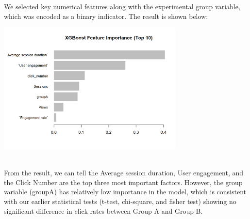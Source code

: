 \documentclass[
  letterpaper,
  DIV=11,
  numbers=noendperiod]{scrartcl}
\begin{document}
We selected key numerical features along with the experimental group
variable, which was encoded as a binary indicator. The result is shown
below:\\
\begin{center}
\includegraphics[width=0.7\textwidth,height=\textheight]{data_ana_pj3_files/figure-html/unnamed-chunk-8-1.png}
\end{center}
\\
From the result, we can tell the Average session duration, User
engagement, and the Click Number are the top three most important
factors. However, the group variable (groupA) has relatively low
importance in the model, which is consistent with our earlier
statistical tests (t-test, chi-square, and fisher test) showing no
significant difference in click rates between Group A and Group B.\\
\end{document}
